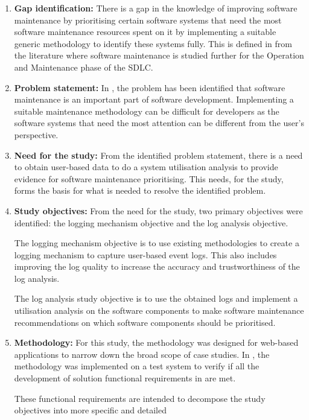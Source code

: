 \begin{enumerate}[label=\textbf{\Roman*.}]	
	\item \textbf{Gap identification:} There is a gap in the knowledge of improving software
	maintenance by prioritising certain software systems that need the most software maintenance
	resources spent on it by implementing a suitable generic methodology to identify these
	systems fully. This is defined in  from the literature where software maintenance is
	studied further for the Operation and Maintenance phase of the SDLC.
	\item \textbf{Problem statement:} In , the problem has been
	identified that software maintenance is an important part of software development. Implementing
	a suitable maintenance methodology can be difficult for developers as the software systems that
	need the most attention can be different from the user's perspective.  
	\item \textbf{Need for the study:} From the identified problem statement, there is a need to
	obtain user-based data to do a system utilisation analysis to provide evidence for software
	maintenance prioritising. This needs, for the study, forms the basis for what is needed to resolve
	the identified problem.
	\item \textbf{Study objectives:} From the need for the study, two primary objectives were
	identified: the logging mechanism objective and the log analysis objective.\par The
	logging mechanism objective is to use existing methodologies to create a logging mechanism to
	capture user-based event logs. This also includes improving the log quality to increase the
	accuracy and trustworthiness of the log analysis.\par The log analysis study objective is to use
	the obtained logs and implement a utilisation analysis on the software components to make
	software maintenance recommendations on which software components should be prioritised.
	\item \textbf{Methodology:} For this study, the methodology was designed for web-based
	applications to narrow down the broad scope of case studies. In , the methodology
	was implemented on a test system to verify if all the development of solution functional
	requirements in  are met.\par These functional
	requirements are intended to decompose the study objectives into more specific and detailed

\end{enumerate}
